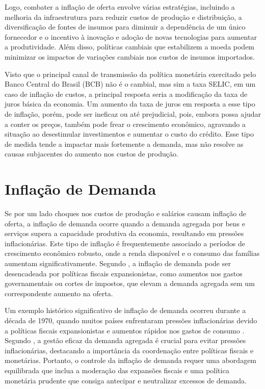 \documentclass[12pt,oneside,a4paper,chapter=TITLE,english,brazil,sumario=abnt-6027-2012]{abntex2}
\begin{document}
Logo, combater a inflação de oferta envolve várias estratégias, incluindo a melhoria da infraestrutura para reduzir custos de produção e distribuição, a diversificação de fontes de insumos para diminuir a dependência de um único fornecedor e o incentivo à inovação e adoção de novas tecnologias para aumentar a produtividade. Além disso, políticas cambiais que estabilizem a moeda podem minimizar os impactos de variações cambiais nos custos de insumos importados. 

Visto que o principal canal de transmissão da política monetária exercitado pelo Banco Central do Brasil (BCB) não é o cambial, mas sim a taxa SELIC, em um caso de inflação de custos, a principal resposta seria a modificação da taxa de juros básica da economia. Um aumento da taxa de juros em resposta a esse tipo de inflação, porém, pode ser ineficaz ou até prejudicial, pois, embora possa ajudar a conter os preços, também pode frear o crescimento econômico, agravando a situação ao desestimular investimentos e aumentar o custo do crédito. Esse tipo de medida tende a impactar mais fortemente a demanda, mas não resolve as causas subjacentes do aumento nos custos de produção.

\section{Inflação de Demanda}

Se por um lado choques nos custos de produção e salários causam inflação de oferta, a inflação de demanda ocorre quando a demanda agregada por bens e serviços supera a capacidade produtiva da economia, resultando em pressões inflacionárias. Este tipo de inflação é frequentemente associado a períodos de crescimento econômico robusto, onde a renda disponível e o consumo das famílias aumentam significativamente. Segundo , a inflação de demanda pode ser desencadeada por políticas fiscais expansionistas, como aumentos nos gastos governamentais ou cortes de impostos, que elevam a demanda agregada sem um correspondente aumento na oferta.

Um exemplo histórico significativo de inflação de demanda ocorreu durante a década de 1970, quando muitos países enfrentaram pressões inflacionárias devido a políticas fiscais expansionistas e aumentos rápidos nos gastos de consumo \cite{blinder_2008_the}. Segundo \cite{woodford_2009_interest}, a gestão eficaz da demanda agregada é crucial para evitar pressões inflacionárias, destacando a importância da coordenação entre políticas fiscais e monetárias. Portanto, o controle da inflação de demanda requer uma abordagem equilibrada que inclua a moderação das expansões fiscais e uma política monetária prudente que consiga antecipar e neutralizar excessos de demanda.
\end{document}
